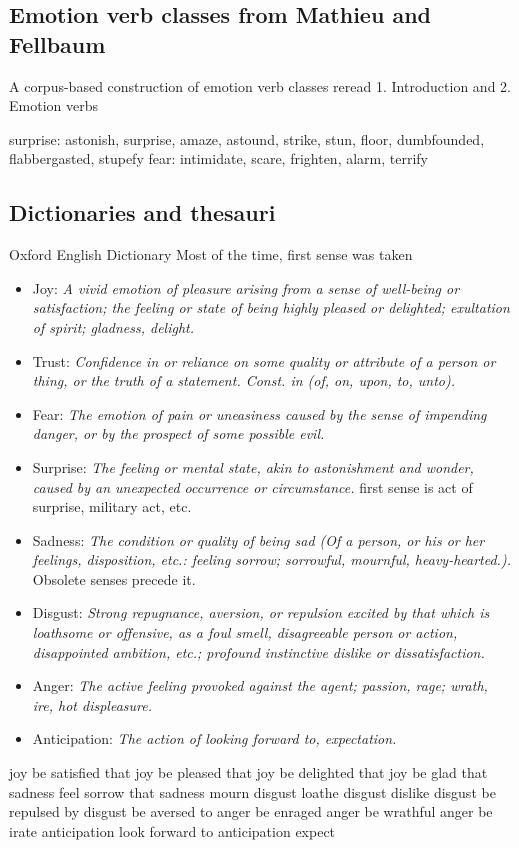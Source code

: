 \subsection{Emotion verb classes from Mathieu and Fellbaum}
A corpus-based construction of emotion verb classes
reread 1. Introduction and 2. Emotion verbs

surprise: astonish, surprise, amaze, astound, strike, stun, floor, dumbfounded, flabbergasted, stupefy
fear: intimidate, scare, frighten, alarm, terrify



\subsection{Dictionaries and thesauri}

Oxford English Dictionary
Most of the time, first sense was taken
\begin{itemize}
	\item Joy: \textit{A vivid emotion of pleasure arising from a sense of well-being or satisfaction; the feeling or state of being highly pleased or delighted; exultation of spirit; gladness, delight.}
	\item Trust: \textit{Confidence in or reliance on some quality or attribute of a person or thing, or the truth of a statement. Const. in (of, on, upon, to, unto).}
	\item Fear: \textit{The emotion of pain or uneasiness caused by the sense of impending danger, or by the prospect of some possible evil.}
	\item Surprise: \textit{The feeling or mental state, akin to astonishment and wonder, caused by an unexpected occurrence or circumstance.} first sense is act of surprise, military act, etc.
	\item Sadness: \textit{The condition or quality of being sad (Of a person, or his or her feelings, disposition, etc.: feeling sorrow; sorrowful, mournful, heavy-hearted.).} Obsolete senses precede it.
	\item Disgust: \textit{Strong repugnance, aversion, or repulsion excited by that which is loathsome or offensive, as a foul smell, disagreeable person or action, disappointed ambition, etc.; profound instinctive dislike or dissatisfaction.}
	\item Anger: \textit{The active feeling provoked against the agent; passion, rage; wrath, ire, hot displeasure.}
	\item Anticipation: \textit{The action of looking forward to, expectation.}
\end{itemize}
joy	be satisfied that
joy	be pleased that
joy	be delighted that
joy	be glad that
sadness	feel sorrow that
sadness mourn
disgust	loathe
disgust dislike
disgust be repulsed by
disgust be aversed to
anger	be enraged
anger	be wrathful
anger	be irate
anticipation	look forward to
anticipation expect


